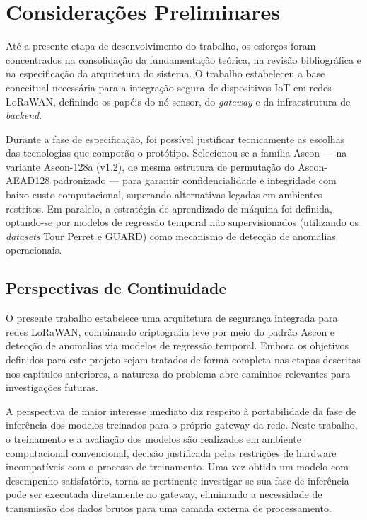 \chapter{Considerações Preliminares} \label{cap:consideracoes}

Até a presente etapa de desenvolvimento do trabalho, os esforços foram concentrados na consolidação da fundamentação teórica, na revisão bibliográfica e na especificação da arquitetura do sistema. O trabalho estabeleceu a base conceitual necessária para a integração segura de dispositivos IoT em redes LoRaWAN, definindo os papéis do nó sensor, do \textit{gateway} e da infraestrutura de \textit{backend}. 

Durante a fase de especificação, foi possível justificar tecnicamente as escolhas das tecnologias que comporão o protótipo. Selecionou-se a família Ascon — na variante Ascon-128a (v1.2), de mesma estrutura de permutação do Ascon-AEAD128 padronizado — para garantir confidencialidade e integridade com baixo custo computacional, superando alternativas legadas em ambientes restritos. Em paralelo, a estratégia de aprendizado de máquina foi definida, optando-se por modelos de regressão temporal não supervisionados (utilizando os \textit{datasets} Tour Perret e GUARD) como mecanismo de detecção de anomalias operacionais.

\section{Perspectivas de Continuidade}

O presente trabalho estabelece uma arquitetura de segurança integrada para 
redes LoRaWAN, combinando criptografia leve por meio do padrão Ascon e 
detecção de anomalias via modelos de regressão temporal. Embora os objetivos 
definidos para este projeto sejam tratados de forma completa nas etapas 
descritas nos capítulos anteriores, a natureza do problema abre caminhos 
relevantes para investigações futuras.

A perspectiva de maior interesse imediato diz respeito à portabilidade da 
fase de inferência dos modelos treinados para o próprio gateway da rede. 
Neste trabalho, o treinamento e a avaliação dos modelos são realizados em 
ambiente computacional convencional, decisão justificada pelas restrições de 
hardware incompatíveis com o processo de treinamento. Uma vez
obtido um modelo com desempenho satisfatório, torna-se pertinente investigar
se sua fase de inferência pode ser executada diretamente no gateway,
eliminando a necessidade de transmissão dos dados brutos para uma camada 
externa de processamento.

